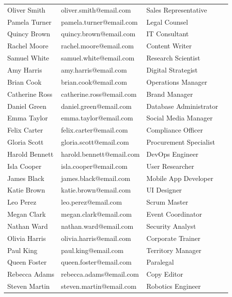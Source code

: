 \begin{longtable}[c]{llll}
    Oliver Smith   & oliver.smith@email.com   & Sales Representative      \\
    Pamela Turner  & pamela.turner@email.com  & Legal Counsel             \\
    Quincy Brown   & quincy.brown@email.com   & IT Consultant             \\
    Rachel Moore   & rachel.moore@email.com   & Content Writer            \\
    Samuel White   & samuel.white@email.com   & Research Scientist        \\
    Amy Harris     & amy.harris@email.com     & Digital Strategist        \\
    Brian Cook     & brian.cook@email.com     & Operations Manager        \\
    Catherine Ross & catherine.ross@email.com & Brand Manager             \\
    Daniel Green   & daniel.green@email.com   & Database Administrator    \\
    Emma Taylor    & emma.taylor@email.com    & Social Media Manager      \\
    Felix Carter   & felix.carter@email.com   & Compliance Officer        \\
    Gloria Scott   & gloria.scott@email.com   & Procurement Specialist    \\
    Harold Bennett & harold.bennett@email.com & DevOps Engineer           \\
    Isla Cooper    & isla.cooper@email.com    & User Researcher           \\
    James Black    & james.black@email.com    & Mobile App Developer      \\
    Katie Brown    & katie.brown@email.com    & UI Designer               \\
    Leo Perez      & leo.perez@email.com      & Scrum Master              \\
    Megan Clark    & megan.clark@email.com    & Event Coordinator         \\
    Nathan Ward    & nathan.ward@email.com    & Security Analyst          \\
    Olivia Harris  & olivia.harris@email.com  & Corporate Trainer         \\
    Paul King      & paul.king@email.com      & Territory Manager         \\
    Queen Foster   & queen.foster@email.com   & Paralegal                 \\
    Rebecca Adams  & rebecca.adams@email.com  & Copy Editor               \\
    Steven Martin  & steven.martin@email.com  & Robotics Engineer         \\
\end{longtable}

